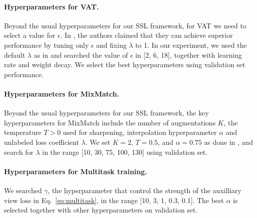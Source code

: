\paragraph{Hyperparameters for VAT.}
Beyond the usual hyperparameters for our SSL framework, for VAT we need to select a value for $\epsilon$.
In \citet{miyatoVirtualAdversarialTraining2019}, the authors claimed that they can achieve superior performance by tuning only $\epsilon$ and fixing $\lambda$ to 1. In our experiment, we used the default $\lambda$ as in \cite{berthelotMixmatchHolisticApproach2019} and searched the value of $\epsilon$ in [2, 6, 18], together with learning rate and weight decay. We select the best hyperparameters using validation set performance. 


\paragraph{Hyperparameters for MixMatch.}
Beyond the usual hyperparameters for our SSL framework, the key hyperparameters for MixMatch include the number of augmentations $K$, the temperature $T>0$ used for sharpening, interpolation hyperparameter $\alpha$ and unlabeled loss coefficient $\lambda$. We set $K=2$, $T=0.5$, and $\alpha=0.75$ as done in \citet{berthelotMixmatchHolisticApproach2019}, and search for $\lambda$ in the range [10, 30, 75, 100, 130] using validation set. 

\paragraph{Hyperparameters for Multitask training.}
We searched $\gamma$, the hyperparameter that control the strength of the auxilliary view loss in Eq.~\eqref{eq:multitask}, in the range [10, 3, 1, 0.3, 0.1]. The best $\alpha$ is selected together with other hyperparameters on validation set. 

